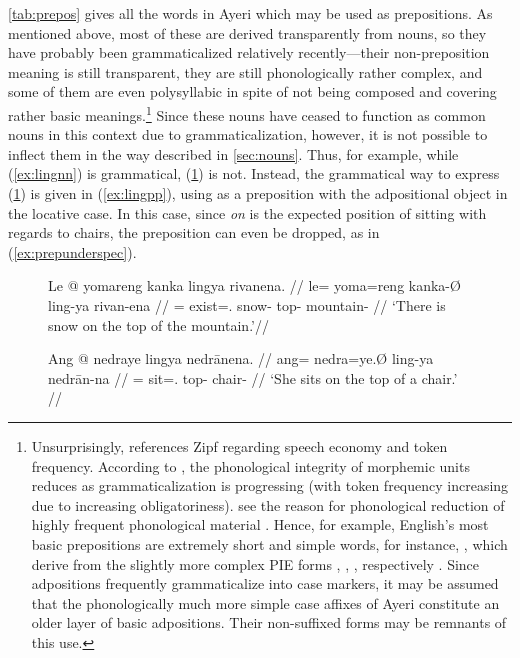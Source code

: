 
\autoref{tab:prepos} gives all the words in Ayeri which may be used as
prepositions. As mentioned above, most of these are derived transparently from
nouns, so they have probably been grammaticalized relatively recently---their
non-preposition meaning is still transparent, they are still phonologically
rather complex, and some of them are even polysyllabic in spite of not being
composed and covering rather basic meanings.\footnote{Unsurprisingly,
\citet[129]{hagege2010} references Zipf regarding speech economy and token
frequency. According to \citet[134--141]{lehmann2015}, the phonological
integrity of morphemic units reduces as grammaticalization is progressing (with
token frequency increasing due to increasing obligatoriness).
\citet{bybeehopper2001b} see the reason for phonological reduction of highly
frequent phonological material . Hence, for example, English's most basic prepositions
are extremely short and simple words, for instance, , which
derive from the slightly more complex PIE forms , ,
, respectively \citep[1, 39, 269]{kroonen2013}. Since adpositions
frequently grammaticalize into case markers, it may be assumed that the
phonologically much more simple case affixes of Ayeri constitute an older layer
of basic adpositions. Their non-suffixed forms may be remnants of this use.}
Since these nouns have ceased to function as common nouns in this context due
to grammaticalization, however, it is not possible to inflect them in the way
described in \autoref{sec:nouns}. Thus, for example, while (\ref{ex:lingnn}) is
grammatical, (\ref{ex:lingpr}) is not. Instead, the grammatical way to express
(\ref{ex:lingpr}) is given in (\ref{ex:lingpp}), using  as a
preposition with the adpositional object in the locative case. In this case,
since \emph{on} is the expected position of sitting with regards to chairs, the
preposition can even be dropped, as in (\ref{ex:prepunderspec}).

\begin{figure}[h]
\pex
\a\label{ex:lingnn}\begingl
	\gla Le @ yomareng kanka lingya rivanena. //
	\glb le= yoma=reng kanka-Ø ling-ya rivan-ena //
	\glc \PatTI{}= exist=\TsgI{}.\Aarg{} snow-\Top{} top-\Loc{}
		mountain-\Gen{} //
	\glft `There is snow on the top of the mountain.'\footnotemark //
\endgl

\a\label{ex:lingpr}\ljudge* \begingl
	\gla Ang @ nedraye lingya nedrānena. //
	\glb ang= nedra=ye.Ø ling-ya nedrān-na //
	\glc \AgtT{}= sit=\TsgF{}.\Top{} top-\Loc{} chair-\Gen{} //
	\glft `\ques{}She sits on the top of a chair.' //
\endgl
\xe
\end{figure}

